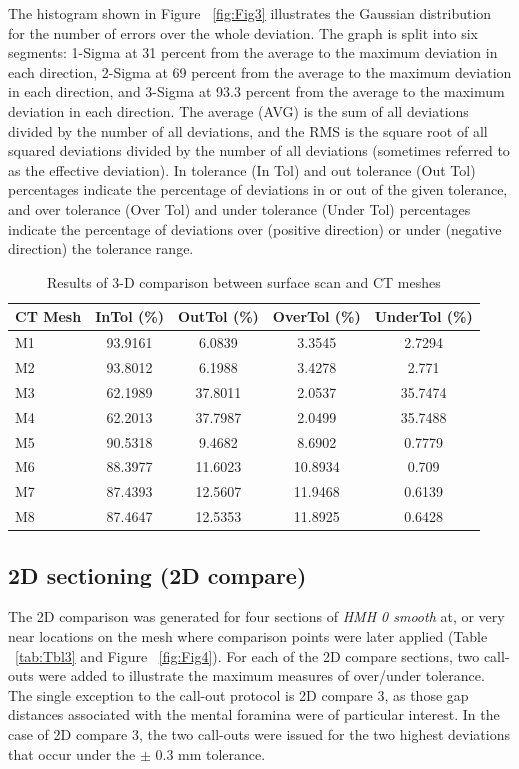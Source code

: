 \documentclass[review]{elsarticle}
\begin{document}
The histogram shown in Figure ~\ref{fig:Fig3} illustrates the Gaussian distribution for the number of errors over the whole deviation. The graph is split into six segments: 1-Sigma at 31 percent from the average to the maximum deviation in each direction, 2-Sigma at 69 percent from the average to the maximum deviation in each direction, and 3-Sigma at 93.3 percent from the average to the maximum deviation in each direction. The average (AVG) is the sum of all deviations divided by the number of all deviations, and the RMS is the square root of all squared deviations divided by the number of all deviations (sometimes referred to as the effective deviation). In tolerance (In Tol) and out tolerance (Out Tol) percentages indicate the percentage of deviations in or out of the given tolerance, and over tolerance (Over Tol) and under tolerance (Under Tol) percentages indicate the percentage of deviations over (positive direction) or under (negative direction) the tolerance range. 

\begin{table}[tbh]\centering
\footnotesize
\caption{Results of 3-D comparison between surface scan and CT meshes}
\centering
\begin{tabular}{lcccc}
\hline
CT Mesh & InTol (\%) & OutTol (\%) & OverTol (\%) & UnderTol (\%)\\
\hline
M1 & 93.9161 & 6.0839 & 3.3545 & 2.7294\\
M2 & 93.8012 & 6.1988 & 3.4278 & 2.771\\
M3 & 62.1989 & 37.8011 & 2.0537 & 35.7474\\
M4 & 62.2013 & 37.7987 & 2.0499 & 35.7488\\
M5 & 90.5318 & 9.4682 & 8.6902 & 0.7779\\
M6 & 88.3977 & 11.6023 & 10.8934 & 0.709\\
M7 & 87.4393 & 12.5607 & 11.9468 & 0.6139\\
M8 & 87.4647 & 12.5353 & 11.8925 & 0.6428\\
\hline
\end{tabular}
\label{tab:Tbl2}
\end{table}

\subsection*{2D sectioning (2D compare)}

The 2D comparison was generated for four sections of \textit{HMH 0 smooth} at, or very near locations on the mesh where comparison points were later applied (Table ~\ref{tab:Tbl3} and Figure ~\ref{fig:Fig4}). For each of the 2D compare sections, two call-outs were added to illustrate the maximum measures of over/under tolerance. The single exception to the call-out protocol is 2D compare 3, as those gap distances associated with the mental foramina were of particular interest. In the case of 2D compare 3, the two call-outs were issued for the two highest deviations that occur under the $\pm$ 0.3 mm tolerance. 
\end{document}

